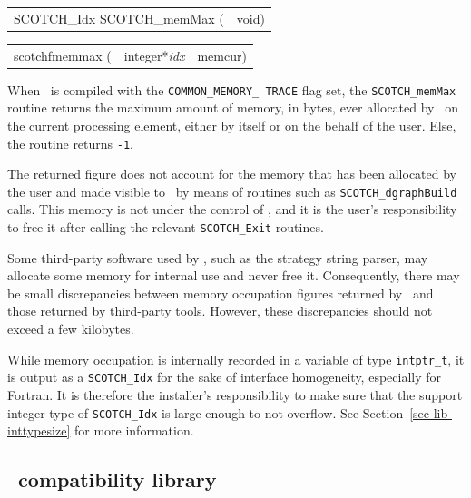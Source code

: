 \begin{itemize}
\progsyn

{\tt\begin{tabular}{l@{}l}
SCOTCH\_Idx SCOTCH\_memMax ( & void)
\end{tabular}}

{\tt\begin{tabular}{l@{}ll}
scotchfmemmax ( & integer*{\it idx} & memcur) \\

\end{tabular}}

\progdes

When \scotch\ is compiled with the {\tt COMMON\_\lbt MEMORY\_\lbt
TRACE} flag set, the {\tt SCOTCH\_memMax} routine returns the maximum
amount of memory, in bytes, ever allocated by \scotch\ on the current
processing element, either by itself or on the behalf of the
user. Else, the routine returns {\tt -1}.

The returned figure does not account for the memory that has been
allocated by the user and made visible to \scotch\ by means of
routines such as {\tt SCOTCH\_\lbt dgraph\lbt Build} calls. This
memory is not under the control of \scotch, and it is the user's
responsibility to free it after calling the relevant
{\tt SCOTCH\_\lbt *\lbt Exit} routines.

Some third-party software used by \scotch, such as the strategy string
parser, may allocate some memory for internal use and never free it.
Consequently, there may be small discrepancies between memory
occupation figures returned by \scotch\ and those returned by
third-party tools. However, these discrepancies should not exceed a
few kilobytes.

While memory occupation is internally recorded in a variable of type
{\tt intptr\_\lbt t}, it is output as a {\tt SCOTCH\_\lbt Idx} for the
sake of interface homogeneity, especially for Fortran. It is therefore
the installer's responsibility to make sure that the support integer
type of {\tt SCOTCH\_\lbt Idx} is large enough to not overflow. See
Section~\ref{sec-lib-inttypesize} for more information.
\end{itemize}

\subsection{\parmetis\ compatibility library}
\label{sec-lib-func-parmetis}

